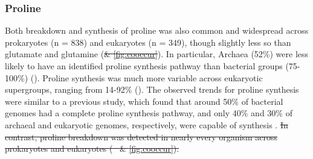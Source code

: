 \documentclass[utf8]{frontiersSCNS} %
\providecommand{\DIFdeltex}[1]{{\protect\color{red}\sout{#1}}}                      %
\providecommand{\DIFdelbegin}{} %
\providecommand{\DIFdelend}{} %
\providecommand{\DIFdel}[1]{\texorpdfstring{\DIFdeltex{#1}}{}} %
\begin{document}
\subsubsection*{Proline}
Both breakdown and synthesis of proline was also common and widespread across prokaryotes (n = 838) and eukaryotes (n = 349), though slightly less so than glutamate and glutamine (\DIFdelbegin \DIFdel{\& \ref{fig:cooccur}}\DIFdelend ). In particular, Archaea (52\%) were less likely to have an identified proline synthesis pathway than bacterial groups (75-100\%) (). Proline synthesis was much more variable across eukaryotic supergroups, ranging from 14-92\% (). The observed trends for proline synthesis were similar to a previous study, which found that around 50\% of bacterial genomes had a complete proline synthesis pathway, and only 40\% and 30\% of archaeal and eukaryotic genomes, respectively, were capable of synthesis \citep{Mee2012}. 
\DIFdelbegin \DIFdel{In contrast, proline breakdown was detected in nearly every organism across prokaryotes and eukaryotes (\mbox{%
\Cref{fig:euk-bac-comp} }%
\& \ref{fig:cooccur}). 
}\DIFdelend 
\end{document}
